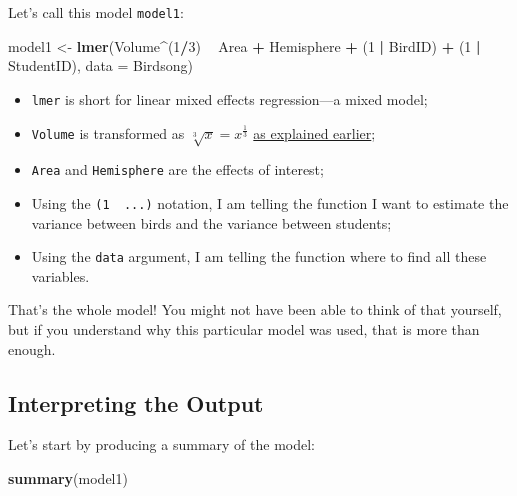 \documentclass[
]{book}
\newenvironment{Shaded}{\begin{snugshade}}{\end{snugshade}}
\newcommand{\DataTypeTok}[1]{\textcolor[rgb]{0.13,0.29,0.53}{#1}}
\newcommand{\DecValTok}[1]{\textcolor[rgb]{0.00,0.00,0.81}{#1}}
\newcommand{\KeywordTok}[1]{\textcolor[rgb]{0.13,0.29,0.53}{\textbf{#1}}}
\newcommand{\NormalTok}[1]{#1}
\newcommand{\OperatorTok}[1]{\textcolor[rgb]{0.81,0.36,0.00}{\textbf{#1}}}
\newcommand{\StringTok}[1]{\textcolor[rgb]{0.31,0.60,0.02}{#1}}
\providecommand{\tightlist}{%
  \setlength{\itemsep}{0pt}\setlength{\parskip}{0pt}}
\begin{document}
Let's call this model \texttt{model1}:

\begin{Shaded}
\begin{Highlighting}[]
\NormalTok{model1 <-}\StringTok{ }\KeywordTok{lmer}\NormalTok{(Volume}\OperatorTok{^}\NormalTok{(}\DecValTok{1}\OperatorTok{/}\DecValTok{3}\NormalTok{) }\OperatorTok{~}\StringTok{ }\NormalTok{Area }\OperatorTok{+}\StringTok{ }\NormalTok{Hemisphere }\OperatorTok{+}\StringTok{ }\NormalTok{(}\DecValTok{1} \OperatorTok{|}\StringTok{ }\NormalTok{BirdID) }\OperatorTok{+}\StringTok{ }\NormalTok{(}\DecValTok{1} \OperatorTok{|}\StringTok{ }\NormalTok{StudentID), }
               \DataTypeTok{data =}\NormalTok{ Birdsong)}
\end{Highlighting}
\end{Shaded}

\begin{itemize}
\tightlist
\item
  \texttt{lmer} is short for linear mixed effects regression---a mixed model;
\item
  \texttt{Volume} is transformed as \(\sqrt[3]{x} = x^{\frac{1}{3}}\) \protect\hyperlink{braintransform}{as explained earlier};
\item
  \texttt{Area} and \texttt{Hemisphere} are the effects of interest;
\item
  Using the \texttt{(1\ \textbar{}\ ...)} notation, I am telling the function I want to estimate the variance between birds and the variance between students;
\item
  Using the \texttt{data} argument, I am telling the function where to find all these variables.
\end{itemize}

That's the whole model! You might not have been able to think of that yourself, but if you understand why this particular model was used, that is more than enough.

\hypertarget{interpreting-the-output}{%
\subsection{Interpreting the Output}\label{interpreting-the-output}}

Let's start by producing a summary of the model:

\begin{Shaded}
\begin{Highlighting}[]
\KeywordTok{summary}\NormalTok{(model1)}
\end{Highlighting}
\end{Shaded}
\end{document}
